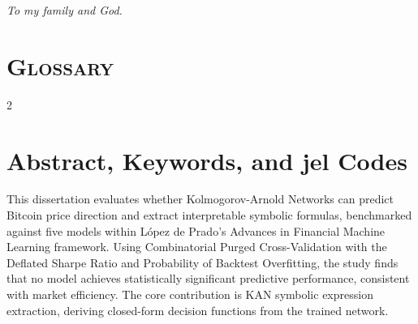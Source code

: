 \documentclass[11pt,a4paper,oneside]{article}
\begin{document}
\newpage
\thispagestyle{empty}
\vspace*{\fill}
\begin{flushright}
\textit{%
To my family and God.
}
\end{flushright}


\newpage
\thispagestyle{plain}

\setcounter{page}{1}

\glsaddall
{}
\section*{\normalfont\scshape\normalsize Glossary}
\begin{multicols*}{2}
\small
\printglossary[type=\acronymtype, title={}]
\end{multicols*}


\newpage
\thispagestyle{plain}

\section*{Abstract, Keywords, and \gls{jel} Codes}

This dissertation evaluates whether Kolmogorov-Arnold Networks can predict Bitcoin price direction and extract interpretable symbolic formulas, benchmarked against five models within López de Prado's Advances in Financial Machine Learning framework. Using Combinatorial Purged Cross-Validation with the Deflated Sharpe Ratio and Probability of Backtest Overfitting, the study finds that no model achieves statistically significant predictive performance, consistent with market efficiency. The core contribution is KAN symbolic expression extraction, deriving closed-form decision functions from the trained network.

\vspace{1em}
\end{document}
